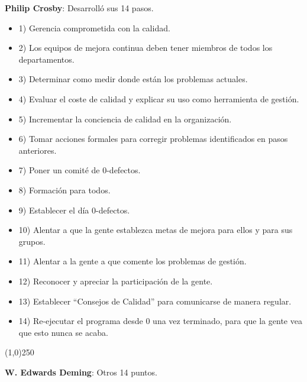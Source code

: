 \documentclass[oneside]{book}
\begin{document}
\textbf{Philip Crosby}: Desarrolló sus 14 pasos. 
\begin{itemize} \item 1) Gerencia comprometida con la calidad. \item 2) Los equipos de mejora continua deben tener miembros de todos los departamentos. \item 3) Determinar como medir donde están los problemas actuales. \item 4) Evaluar el coste de calidad y explicar su uso como herramienta de gestión. \item 5) Incrementar la conciencia de calidad en la organización. \item 6) Tomar acciones formales para corregir problemas identificados en pasos anteriores. \item 7) Poner un comité de 0-defectos. \item 8) Formación para todos. \item 9) Establecer el día 0-defectos. \item 10) Alentar a que la gente establezca metas de mejora para ellos y para sus grupos. \item 11) Alentar a la gente a que comente los problemas de gestión. \item 12) Reconocer y apreciar la participación de la gente. \item 13) Establecer ``Consejos de Calidad'' para comunicarse de manera regular. \item 14) Re-ejecutar el programa desde 0 una vez terminado, para que la gente vea que esto nunca se acaba. 
	\end{itemize}
\begin{center}
	\line(1,0){250}
\end{center}
\textbf{W. Edwards Deming}: Otros 14 puntos. 
\end{document}
